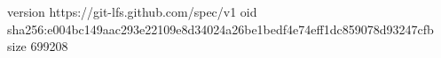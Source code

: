 version https://git-lfs.github.com/spec/v1
oid sha256:e004bc149aac293e22109e8d34024a26be1bedf4e74eff1dc859078d93247cfb
size 699208
